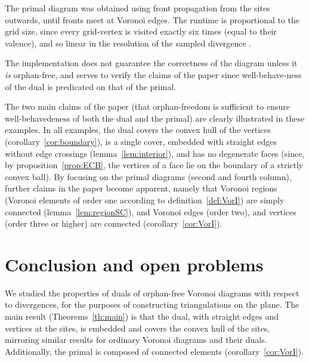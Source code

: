 \documentclass[11pt]{article}
\begin{document}
The primal diagram was obtained using front propagation from the sites
outwards, until fronts meet at Voronoi edges. 
The runtime is proportional to the grid size, since every grid-vertex is visited exactly six times (equal to their valence), 
	and so linear in the resolution of the sampled divergence . 

The implementation does not guarantee the correctness of the diagram unless it \emph{is} orphan-free, and serves to verify the claims of the paper since well-behave-ness of the dual is predicated on that of the primal. 

The two main claims of the paper (that orphan-freedom is sufficient to ensure well-behavedeness of 
both the dual and the primal) are clearly illustrated in these examples. 
In all examples, the dual covers the convex hull of the vertices
(corollary~\ref{cor:boundary}), is a
single cover, embedded with straight edges without edge crossings
(lemma~\ref{lem:interior}), 
and has no degenerate faces 
(since, by proposition~\ref{prop:ECB}, the vertices of a face lie on the boundary of a strictly convex ball). 
By focusing on the primal diagrams (second and fourth column), further claims in
the paper become apparent, namely that Voronoi regions 
(Voronoi elements of order one according to definition~\ref{def:VorI}) are simply connected (lemma~\ref{lem:regionSC}), 
and Voronoi edges (order two), and vertices (order three or higher) are connected (corollary~\ref{cor:VorI}). 


\section{Conclusion and open problems}

We studied the properties of duals of orphan-free Voronoi diagrams with respect to divergences, for the
purposes of constructing triangulations on the plane. 
The main result (Theorems~\ref{th:main}) is that
the dual, with straight edges and vertices at the sites, is embedded
and covers the convex hull of the sites, mirroring similar results for
ordinary Voronoi diagrams and their duals.
Additionally, the primal is composed of connected elements (corollary~\ref{cor:VorI}). 
\end{document}
